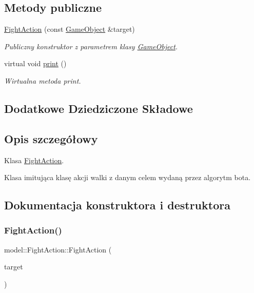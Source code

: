 \subsection*{Metody publiczne}
\begin{DoxyCompactItemize}
\item 
\hyperlink{classmodel_1_1FightAction_ada818e85e1cc27631dbabe10402b210f}{Fight\+Action} (const \hyperlink{classmodel_1_1GameObject}{Game\+Object} \&target)
\begin{DoxyCompactList}\small\item\em Publiczny konstruktor z parametrem klasy \hyperlink{classmodel_1_1GameObject}{Game\+Object}. \end{DoxyCompactList}\item 
virtual void \hyperlink{classmodel_1_1FightAction_a416846e68a9aa998412da4d439dbc6cc}{print} ()
\begin{DoxyCompactList}\small\item\em Wirtualna metoda print. \end{DoxyCompactList}\end{DoxyCompactItemize}
\subsection*{Dodatkowe Dziedziczone Składowe}


\subsection{Opis szczegółowy}
Klasa \hyperlink{classmodel_1_1FightAction}{Fight\+Action}. 

Klasa imitująca klasę akcji walki z danym celem wydaną przez algorytm bota. 

\subsection{Dokumentacja konstruktora i destruktora}
\mbox{\label{classmodel_1_1FightAction_ada818e85e1cc27631dbabe10402b210f}} 
\subsubsection{\texorpdfstring{Fight\+Action()}{FightAction()}}
{\footnotesize\ttfamily model\+::\+Fight\+Action\+::\+Fight\+Action (\begin{DoxyParamCaption}\item[{const \hyperlink{classmodel_1_1GameObject}{Game\+Object} \&}]{target }\end{DoxyParamCaption})\hspace{0.3cm}{\ttfamily [inline]}}




